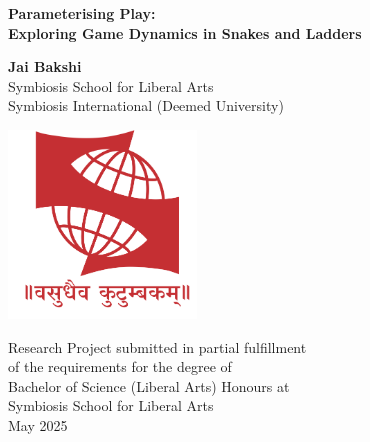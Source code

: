 \begin{titlepage}
	\begin{center}
		\vspace*{2cm}
		
		\Large
		\textbf{Parameterising Play:\\ Exploring Game Dynamics in Snakes and Ladders}
		\linebreak
		
		\vspace{0.5cm}
		
		\vspace{1.5cm}
		
		\textbf{Jai Bakshi}\\
		\vspace{0.2cm}
		Symbiosis School for Liberal Arts\\
		\vspace{0.2cm}
		Symbiosis International (Deemed University)
		
		\vfill
		
		\includegraphics[width=5cm]{SIU_Logo.png}
		
		\vfill
		
		\Large
		Research Project submitted in partial fulfillment\\
		\vspace{0.2cm}
		of the requirements for the degree of\\
		\vspace{0.2cm}
		Bachelor of Science (Liberal Arts) Honours at\\ 
		\vspace{0.2cm}
		Symbiosis School for Liberal Arts\\
		\vspace{0.2cm}
		May 2025
		\vspace{2cm}
	\end{center}
\end{titlepage}